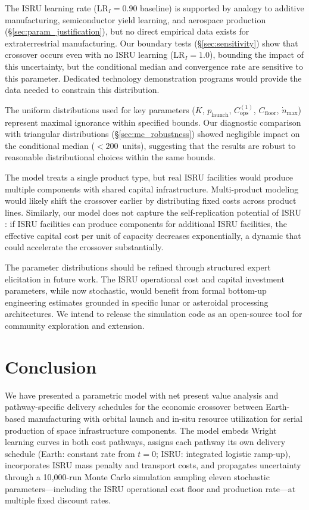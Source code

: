 \documentclass[preprint,12pt]{elsarticle}
\begin{document}
The ISRU learning rate ($\mathrm{LR}_I = 0.90$ baseline) is supported by analogy to additive manufacturing, semiconductor yield learning, and aerospace production (\S\ref{sec:param_justification}), but no direct empirical data exists for extraterrestrial manufacturing. Our boundary tests (\S\ref{sec:sensitivity}) show that crossover occurs even with no ISRU learning ($\mathrm{LR}_I = 1.0$), bounding the impact of this uncertainty, but the conditional median and convergence rate are sensitive to this parameter. Dedicated technology demonstration programs would provide the data needed to constrain this distribution.

The uniform distributions used for key parameters ($K$, $p_{\mathrm{launch}}$, $C_{\mathrm{ops}}^{(1)}$, $C_{\mathrm{floor}}$, $\dot{n}_{\max}$) represent maximal ignorance within specified bounds. Our diagnostic comparison with triangular distributions (\S\ref{sec:mc_robustness}) showed negligible impact on the conditional median ($<200$~units), suggesting that the results are robust to reasonable distributional choices within the same bounds.

The model treats a single product type, but real ISRU facilities would produce multiple components with shared capital infrastructure. Multi-product modeling would likely shift the crossover earlier by distributing fixed costs across product lines. Similarly, our model does not capture the self-replication potential of ISRU \cite{metzger2013}: if ISRU facilities can produce components for additional ISRU facilities, the effective capital cost per unit of capacity decreases exponentially, a dynamic that could accelerate the crossover substantially.

The parameter distributions should be refined through structured expert elicitation in future work. The ISRU operational cost and capital investment parameters, while now stochastic, would benefit from formal bottom-up engineering estimates grounded in specific lunar or asteroidal processing architectures. We intend to release the simulation code as an open-source tool for community exploration and extension.

\section{Conclusion}
\label{sec:conclusion}

We have presented a parametric model with net present value analysis and pathway-specific delivery schedules for the economic crossover between Earth-based manufacturing with orbital launch and in-situ resource utilization for serial production of space infrastructure components. The model embeds Wright learning curves in both cost pathways, assigns each pathway its own delivery schedule (Earth: constant rate from $t = 0$; ISRU: integrated logistic ramp-up), incorporates ISRU mass penalty and transport costs, and propagates uncertainty through a 10{,}000-run Monte Carlo simulation sampling eleven stochastic parameters---including the ISRU operational cost floor and production rate---at multiple fixed discount rates.
\end{document}
